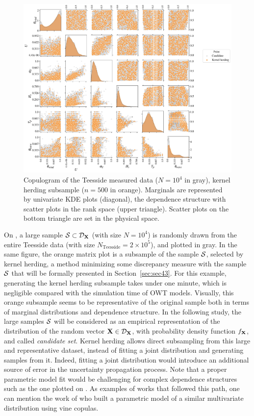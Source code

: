 \begin{figure}[!h]
    \begin{center}
        \includegraphics[width=\linewidth]{part2/figures/DCE/teesside/pairplot_kh.jpg}    
    \end{center}
    \caption{Copulogram of the Teesside measured data ($N=10^4$ in gray), kernel herding subsample ($n=500$ in orange). 
    Marginals are represented by univariate KDE plots (diagonal), the dependence structure with scatter plots in the rank space (upper triangle). 
    Scatter plots on the bottom triangle are set in the physical space.}
    \label{fig:envi_pairplot}
\end{figure}

On , a large sample $\mathcal{S} \subset \mathcal{D}_{{\bf X}}$ (with size $N=10^4$) is randomly drawn from the entire Teesside data (with size $N_{\mathrm{Teesside}} = 2\times 10^5$), and plotted in gray. 
In the same figure, the orange matrix plot is a subsample of the sample $\mathcal{S}$, selected by kernel herding, a method minimizing some discrepancy measure with the sample $\mathcal{S}$ that will be formally presented in Section~\ref{sec:sec43}. 
For this example, generating the kernel herding subsample takes under one minute, which is negligible compared with the simulation time of OWT models. 
Visually, this orange subsample seems to be representative of the original sample both in terms of marginal distributions and dependence structure. 
In the following study, the large samples $\mathcal{S}$ will be considered as an empirical representation of the distribution of the random vector ${\bf X} \in \mathcal{D}_{{\bf X}}$, with probability density function $f_{{\bf X}}$, and called \textit{candidate set}. 
Kernel herding allows direct subsampling from this large and representative dataset, instead of fitting a joint distribution and generating samples from it.
Indeed, fitting a joint distribution would introduce an additional source of error in the uncertainty propagation process.
Note that a proper parametric model fit would be challenging for complex dependence structures such as the one plotted on . 
As examples of works that followed this path, one can mention the work of \citet{li_zhan_2020} who built a parametric model of a similar multivariate distribution using vine copulas. 


